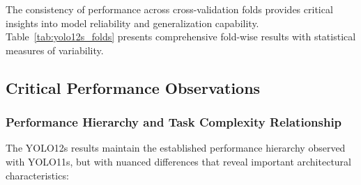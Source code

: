 The consistency of performance across cross-validation folds provides critical insights into model reliability and generalization capability. Table~\ref{tab:yolo12s_folds} presents comprehensive fold-wise results with statistical measures of variability.

\begin{table}[htbp]
\centering
\caption{YOLO12s Fold-Wise Performance Distribution (mAP50-95)}
\label{tab:yolo12s_folds}
\end{table}

\subsection{Critical Performance Observations}

\subsubsection{Performance Hierarchy and Task Complexity Relationship}

The YOLO12s results maintain the established performance hierarchy observed with YOLO11s, but with nuanced differences that reveal important architectural characteristics:

